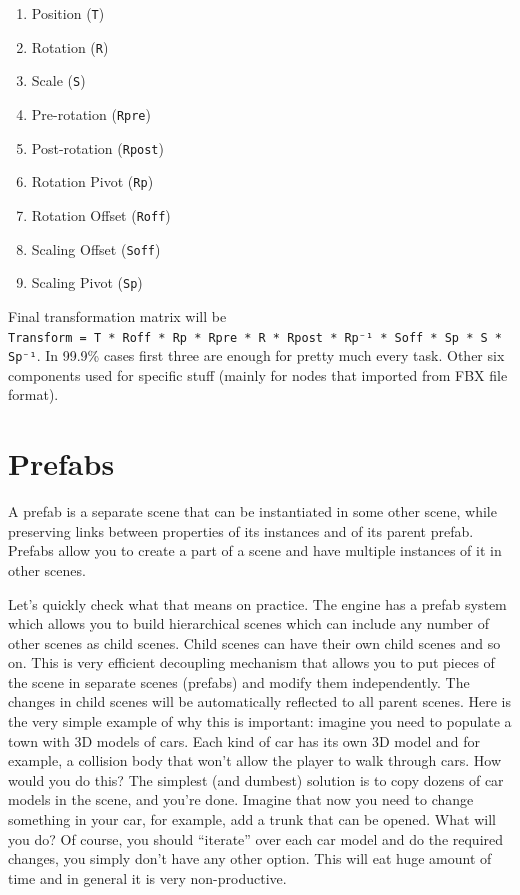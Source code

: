 \documentclass[
]{book}
\providecommand{\tightlist}{%
  \setlength{\itemsep}{0pt}\setlength{\parskip}{0pt}}
\theoremstyle{definition}
\theoremstyle{definition}
\theoremstyle{definition}
\theoremstyle{definition}
\theoremstyle{remark}
\begin{document}
\begin{enumerate}
\def\labelenumi{\arabic{enumi})}
\tightlist
\item
  Position (\texttt{T})
\item
  Rotation (\texttt{R})
\item
  Scale (\texttt{S})
\item
  Pre-rotation (\texttt{Rpre})
\item
  Post-rotation (\texttt{Rpost})
\item
  Rotation Pivot (\texttt{Rp})
\item
  Rotation Offset (\texttt{Roff})
\item
  Scaling Offset (\texttt{Soff})
\item
  Scaling Pivot (\texttt{Sp})
\end{enumerate}

Final transformation matrix will be \texttt{Transform\ =\ T\ *\ Roff\ *\ Rp\ *\ Rpre\ *\ R\ *\ Rpost\ *\ Rp⁻¹\ *\ Soff\ *\ Sp\ *\ S\ *\ Sp⁻¹}. In 99.9\% cases first three are enough for pretty much every task. Other six components used for specific stuff (mainly for nodes that imported from FBX file format).

\section{Prefabs}\label{prefabs}

A prefab is a separate scene that can be instantiated in some other scene, while preserving links between properties of its instances and of its parent prefab. Prefabs allow you to create a part of a scene and have multiple instances of it in other scenes.

Let's quickly check what that means on practice. The engine has a prefab system which allows you to build hierarchical scenes which can include any number of other scenes as child scenes. Child scenes can have their own child scenes and so on. This is very efficient decoupling mechanism that allows you to put pieces of the scene in separate scenes (prefabs) and modify them independently. The changes in child scenes will be automatically reflected to all parent scenes. Here is the very simple example of why this is important: imagine you need to populate a town with 3D models of cars. Each kind of car has its own 3D model and for example, a collision body that won't allow the player to walk through cars. How would you do this? The simplest (and dumbest) solution is to copy dozens of car models in the scene, and you're done. Imagine that now you need to change something in your car, for example, add a trunk that can be opened. What will you do? Of course, you should ``iterate'' over each car model and do the required changes, you simply don't have any other option. This will eat huge amount of time and in general it is very non-productive.
\end{document}
